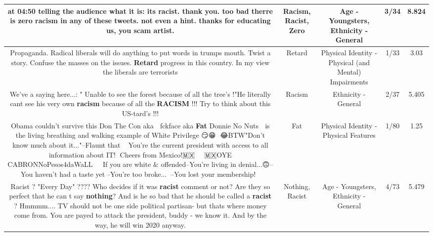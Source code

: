 \documentclass[11pt]{article}
\newlength\mylength
\begin{document}
\begin{center}
\begin{longtable}{|C{.65\mylength}|C{.30\mylength}|C{.12\mylength}|C{.12\mylength}|C{.12\mylength}|}
  \small at 04:50 telling the audience what it is: its \textbf{racist}. thank you. too bad therre is \textbf{zero} \textbf{racism} in any of these tweets. not even a hint. thanks for educating us, you scam artist.\normalsize   & Racism, Racist, Zero & Age - Youngsters, Ethnicity - General & 3/34 & 8.824 \\  \hline
  \small Propaganda. Radical liberals will do anything to put words in trumps mouth. Twist a story. Confuse the masses on the issues. \textbf{Retard} progress in this country. In my view the liberals  are terrorists\normalsize   & Retard & Physical Identity - Physical (and Mental) Impairments & 1/33 & 3.03 \\  \hline
  \small We've a saying here...:  " Unable to see the forest because of all the tree's !"He literally cant see his very own \textbf{racism} because of all the \textbf{RACISM} !!! Try to think about this US-tard's !!!\normalsize   & Racism & Ethnicity - General & 2/37 & 5.405 \\  \hline
  \small Obama couldn't survive this Don The Con aka 🍊 fckface aka \textbf{Fat} Donnie No Nuts 🤭 is the living breathing and walking example of White Privilege 😏😁🤭 😂BTW"Don't know much about it..."--Flaunt that💩🇺🇸 You're the current president with access to all information about IT! 🤬Cheers from Mexico!🇲🇽🌴🍻🤘🏽🌴🇲🇽OYE CABRONNoPesos4daWaLL 🤭😂🤣😂If you are white \& offended--You're living in denial...🙃--You haven't had a taste yet🤤--You're too broke...💸🚫--You lost your membership! 🤭\normalsize   & Fat & Physical Identity - Physical Features & 1/80 & 1.25 \\  \hline
  \small Racist ? "Every Day" ???? Who decides if it was \textbf{racist} comment or not? Are they so perfect that he can t say \textbf{nothing}? And is he so bad that he should be called a \textbf{racist} ? Hmmmm.... TV should not be one side political partisan- but thats where money come from. You are payed to attack the president, buddy - we know it.  And by the way, he will win 2020 anyway.\normalsize   & Nothing, Racist & Age - Youngsters, Ethnicity - General & 4/73 & 5.479 \\  \hline

\end{longtable}
\end{center}
\end{document}

